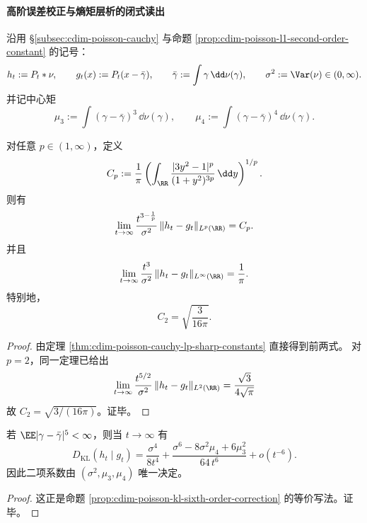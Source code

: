 \paragraph{高阶误差校正与熵矩层析的闭式读出}
沿用 \S\ref{subsec:cdim-poisson-cauchy} 与命题 \ref{prop:cdim-poisson-l1-second-order-constant} 的记号：
\[
h_t:=P_t*\nu,\qquad
g_t(x):=P_t(x-\bar\gamma),\qquad
\bar\gamma:=\int \gamma\,\dd\nu(\gamma),\qquad
\sigma^2:=\Var(\nu)\in(0,\infty).
\]
并记中心矩
\[
\mu_3:=\int (\gamma-\bar\gamma)^3\,\dd\nu(\gamma),\qquad
\mu_4:=\int (\gamma-\bar\gamma)^4\,\dd\nu(\gamma).
\]

\begin{theorem}\label{thm:cdim-poisson-cauchy-lp-sharp-constants-restated}
对任意 \(p\in(1,\infty)\)，定义
\[
C_p:=\frac1\pi\left(\int_{\RR}\frac{|3y^2-1|^p}{(1+y^2)^{3p}}\,\dd y\right)^{1/p}.
\]
则有
\[
\lim_{t\to\infty}\frac{t^{3-\frac1p}}{\sigma^2}\,\|h_t-g_t\|_{L^p(\RR)}=C_p.
\]
并且
\[
\lim_{t\to\infty}\frac{t^3}{\sigma^2}\,\|h_t-g_t\|_{L^\infty(\RR)}=\frac1\pi.
\]
特别地，
\[
C_2=\sqrt{\frac{3}{16\pi}}.
\]
\end{theorem}
\begin{proof}
由定理 \ref{thm:cdim-poisson-cauchy-lp-sharp-constants} 直接得到前两式。
对 \(p=2\)，同一定理已给出
\[
\lim_{t\to\infty}\frac{t^{5/2}}{\sigma^2}\,\|h_t-g_t\|_{L^2(\RR)}=\frac{\sqrt3}{4\sqrt\pi}
\]
故 \(C_2=\sqrt{3/(16\pi)}\)。证毕。
\end{proof}

\begin{theorem}\label{thm:cdim-poisson-kl-two-term-sharp-moment-polynomial}
若 \(\EE|\gamma-\bar\gamma|^5<\infty\)，则当 \(t\to\infty\) 有
\[
D_{\mathrm{KL}}(h_t\mid g_t)
=
\frac{\sigma^4}{8t^4}
+\frac{\sigma^6-8\sigma^2\mu_4+6\mu_3^2}{64\,t^6}
+o(t^{-6}).
\]
因此二项系数由 \((\sigma^2,\mu_3,\mu_4)\) 唯一决定。
\end{theorem}
\begin{proof}
这正是命题 \ref{prop:cdim-poisson-kl-sixth-order-correction} 的等价写法。证毕。
\end{proof}

